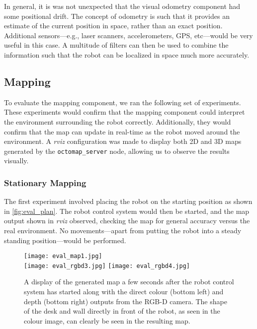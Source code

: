 In general, it is was not unexpected that the visual odometry component had some positional drift. The concept of odometry is such that it provides an estimate of the current position in space, rather than an exact position. Additional sensors---e.g., laser scanners, accelerometers, GPS, etc---would be very useful in this case. A multitude of filters can then be used to combine the information such that the robot can be localized in space much more accurately.

\subsection{Mapping}

To evaluate the mapping component, we ran the following set of experiments. These experiments would confirm that the mapping component could interpret the environment surrounding the robot correctly. Additionally, they would confirm that the map can update in real-time as the robot moved around the environment. A \emph{rviz} configuration was made to display both 2D and 3D maps generated by the \texttt{octomap\_server} node, allowing us to observe the results visually.

\subsubsection{Stationary Mapping}

The first experiment involved placing the robot on the starting position as shown in \autoref{fig:eval_plan}. The robot control system would then be started, and the map output shown in \emph{rviz} observed, checking the map for general accuracy versus the real environment. No movements---apart from putting the robot into a steady standing position---would be performed.

\begin{figure}[h]
	\centering
	\texttt{[image: eval\_map1.jpg]} \\
	\vspace{2pt}
	\texttt{[image: eval\_rgbd3.jpg]}
	\texttt{[image: eval\_rgbd4.jpg]}
	\caption{A display of the generated map a few seconds after the robot control system has started along with the direct colour (bottom left) and depth (bottom right) outputs from the RGB-D camera. The shape of the desk and wall directly in front of the robot, as seen in the colour image, can clearly be seen in the resulting map.}
	\label{fig:eval_map_nobag}
\end{figure}

